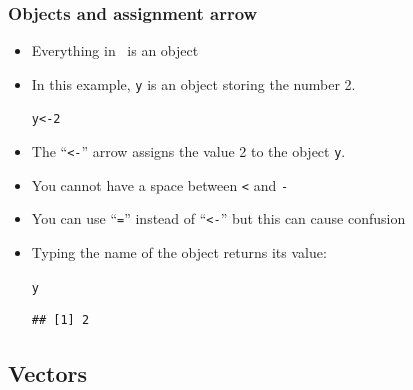\documentclass[color=usenames,dvipsnames]{beamer}\usepackage[]{graphicx}\usepackage[]{color}
\makeatletter
\newcommand{\hlnum}[1]{\textcolor[rgb]{0.686,0.059,0.569}{#1}}%
\newcommand{\hlstd}[1]{\textcolor[rgb]{0.345,0.345,0.345}{#1}}%
\newcommand{\hlkwb}[1]{\textcolor[rgb]{0.69,0.353,0.396}{#1}}%
\newenvironment{kframe}{%
 \def\at@end@of@kframe{}%
 \ifinner\ifhmode%
  \def\at@end@of@kframe{\end{minipage}}%
  \begin{minipage}{\columnwidth}%
 \fi\fi%
 \def\FrameCommand##1{\hskip\@totalleftmargin \hskip-\fboxsep
 \colorbox{shadecolor}{##1}\hskip-\fboxsep
     \hskip-\linewidth \hskip-\@totalleftmargin \hskip\columnwidth}%
 \MakeFramed {\advance\hsize-\width
   \@totalleftmargin\z@ \linewidth\hsize
   \@setminipage}}%
 {\par\unskip\endMakeFramed%
 \at@end@of@kframe}
\newenvironment{knitrout}{}{} %
\makeatother
\begin{document}
\begin{frame}[fragile]
  \frametitle{Objects and assignment arrow}
  \begin{itemize}[<+->]
    \item Everything in \R~is an object %
    \item In this example, \verb+y+ is an object storing the number
      2.
\begin{knitrout}
\color{fgcolor}\begin{kframe}
\begin{alltt}
\hlstd{y} \hlkwb{<-} \hlnum{2}
\end{alltt}
\end{kframe}
\end{knitrout}
    \item The ``\verb+<-+'' arrow assigns the value 2 to the object \verb+y+.
    \item You cannot have a space between \verb+<+ and \verb+-+
    \item You can use ``\verb+=+'' instead of ``\verb+<-+'' but this can cause confusion
    \item Typing the name of the object returns its value:
\begin{knitrout}
\color{fgcolor}\begin{kframe}
\begin{alltt}
\hlstd{y}
\end{alltt}
\begin{verbatim}
## [1] 2
\end{verbatim}
\end{kframe}
\end{knitrout}
  \end{itemize}
\end{frame}


\subsection{Vectors}
\end{document}
